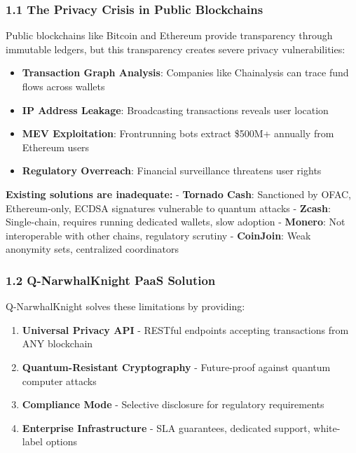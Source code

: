 \documentclass[
  11pt,
]{article}
\providecommand{\tightlist}{%
  \setlength{\itemsep}{0pt}\setlength{\parskip}{0pt}}
\begin{document}
\hypertarget{the-privacy-crisis-in-public-blockchains}{%
\subsubsection{1.1 The Privacy Crisis in Public
Blockchains}\label{the-privacy-crisis-in-public-blockchains}}

Public blockchains like Bitcoin and Ethereum provide transparency
through immutable ledgers, but this transparency creates severe privacy
vulnerabilities:

\begin{itemize}
\tightlist
\item
  \textbf{Transaction Graph Analysis}: Companies like Chainalysis can
  trace fund flows across wallets
\item
  \textbf{IP Address Leakage}: Broadcasting transactions reveals user
  location
\item
  \textbf{MEV Exploitation}: Frontrunning bots extract \$500M+ annually
  from Ethereum users
\item
  \textbf{Regulatory Overreach}: Financial surveillance threatens user
  rights
\end{itemize}

\textbf{Existing solutions are inadequate:} - \textbf{Tornado Cash}:
Sanctioned by OFAC, Ethereum-only, ECDSA signatures vulnerable to
quantum attacks - \textbf{Zcash}: Single-chain, requires running
dedicated wallets, slow adoption - \textbf{Monero}: Not interoperable
with other chains, regulatory scrutiny - \textbf{CoinJoin}: Weak
anonymity sets, centralized coordinators

\hypertarget{q-narwhalknight-paas-solution}{%
\subsubsection{1.2 Q-NarwhalKnight PaaS
Solution}\label{q-narwhalknight-paas-solution}}

Q-NarwhalKnight solves these limitations by providing:

\begin{enumerate}
\def\labelenumi{\arabic{enumi}.}
\tightlist
\item
  \textbf{Universal Privacy API} - RESTful endpoints accepting
  transactions from ANY blockchain
\item
  \textbf{Quantum-Resistant Cryptography} - Future-proof against quantum
  computer attacks
\item
  \textbf{Compliance Mode} - Selective disclosure for regulatory
  requirements
\item
  \textbf{Enterprise Infrastructure} - SLA guarantees, dedicated
  support, white-label options
\end{enumerate}
\end{document}
